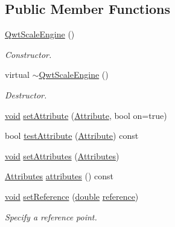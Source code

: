 \subsection*{Public Member Functions}
\begin{DoxyCompactItemize}
\item 
\hyperlink{class_qwt_scale_engine_a58cb9344a913fa798ac7343d55f3f693}{Qwt\-Scale\-Engine} ()
\begin{DoxyCompactList}\small\item\em Constructor. \end{DoxyCompactList}\item 
virtual \hyperlink{class_qwt_scale_engine_ab9c21b4550d44d9a82c1865864cb8943}{$\sim$\-Qwt\-Scale\-Engine} ()
\begin{DoxyCompactList}\small\item\em Destructor. \end{DoxyCompactList}\item 
\hyperlink{group___u_a_v_objects_plugin_ga444cf2ff3f0ecbe028adce838d373f5c}{void} \hyperlink{class_qwt_scale_engine_acf02a88f6e778edbc9e005960f35b3b7}{set\-Attribute} (\hyperlink{class_qwt_scale_engine_a7548418e0896d75eec164bfa2ba3ff5f}{Attribute}, bool on=true)
\item 
bool \hyperlink{class_qwt_scale_engine_ab43cac5ff8843531bbb02b4401e8fb62}{test\-Attribute} (\hyperlink{class_qwt_scale_engine_a7548418e0896d75eec164bfa2ba3ff5f}{Attribute}) const 
\item 
\hyperlink{group___u_a_v_objects_plugin_ga444cf2ff3f0ecbe028adce838d373f5c}{void} \hyperlink{class_qwt_scale_engine_acd73d5f27b5db0bc7ee673eb6fe9810d}{set\-Attributes} (\hyperlink{class_qwt_scale_engine_a798f5f1420019d33baa799d26bca0255}{Attributes})
\item 
\hyperlink{class_qwt_scale_engine_a798f5f1420019d33baa799d26bca0255}{Attributes} \hyperlink{class_qwt_scale_engine_a044961cfa3be3ac86d49610c3881df08}{attributes} () const 
\item 
\hyperlink{group___u_a_v_objects_plugin_ga444cf2ff3f0ecbe028adce838d373f5c}{void} \hyperlink{class_qwt_scale_engine_a89985ea69dbd858c8b9162ecd2be936e}{set\-Reference} (\hyperlink{_super_l_u_support_8h_a8956b2b9f49bf918deed98379d159ca7}{double} \hyperlink{class_qwt_scale_engine_a5962458870865df797e84e3bd6badf02}{reference})
\begin{DoxyCompactList}\small\item\em Specify a reference point. \end{DoxyCompactList}\item 

\end{DoxyCompactItemize}
